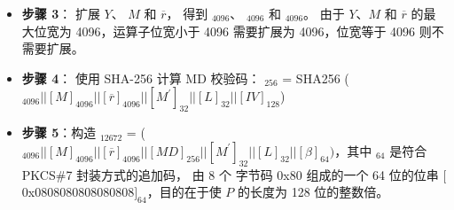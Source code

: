 \documentclass[main\_\_CN.tex]{subfiles}
\begin{document}
\begin{itemize}
    \item {\bfseries 步骤 3}：
          扩展 \begin{math}Y\end{math}、
               \begin{math}M\end{math} 和
               \begin{math}\overline{r}\end{math}，
          得到 \begin{math}[Y]_{4096}\end{math}、
               \begin{math}[M]_{4096}\end{math} 和
               \begin{math}[\overline{r}]_{4096}\end{math}。
          由于 \begin{math}Y\end{math}、\begin{math}M\end{math} 和 \begin{math}\overline{r}\end{math} 的最大位宽为 4096，运算子位宽小于 4096 需要扩展为 4096，位宽等于 4096 则不需要扩展。


    \item {\bfseries 步骤 4}：
            使用 SHA-256 计算 MD 校验码：
                \begin{math}[MD]_{256}\end{math} = SHA256 (\begin{math}
                [Y]_{4096} ||
                [M]_{4096} ||
                [\overline{r}]_{4096} ||
                [M^{\prime}]_{32} ||
                [L]_{32} ||
                [IV]_{128}
            \end{math})

    \item {\bfseries 步骤 5}：构造 \begin{math}[P]_{12672}\end{math} = (
            \begin{math}
                [Y]_{4096} ||
                [M]_{4096} ||
                [\overline{r}]_{4096} ||
                [MD]_{256} ||
                [M^{\prime}]_{32} ||
                [L]_{32} ||
                [\beta]_{64})
            \end{math}，其中 \begin{math}[\beta]_{64} \end{math} 是符合 PKCS\#7 封装方式的追加码， 由 8 个 字节码 0x80 组成的一个 64 位的位串 $[$0x0808080808080808$]_{64}$，目的在于使 \begin{math}P\end{math} 的长度为 128 位的整数倍。


\end{itemize}
\end{document}
